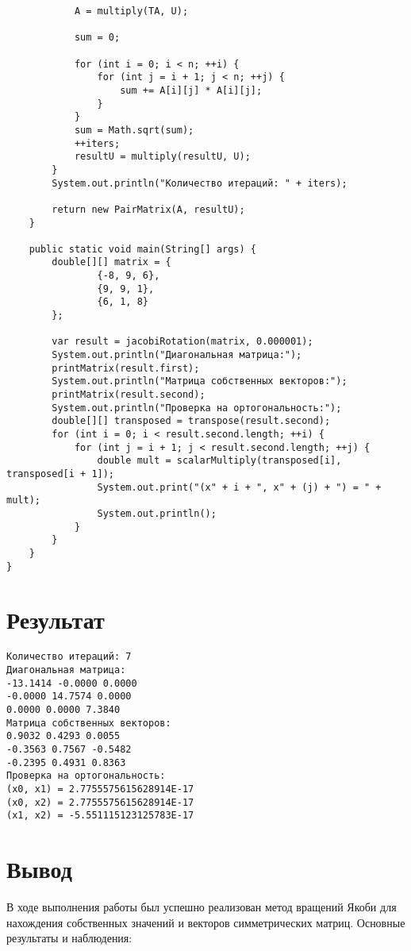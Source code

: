 \begin{verbatim}
            A = multiply(TA, U);

            sum = 0;

            for (int i = 0; i < n; ++i) {
                for (int j = i + 1; j < n; ++j) {
                    sum += A[i][j] * A[i][j];
                }
            }
            sum = Math.sqrt(sum);
            ++iters;
            resultU = multiply(resultU, U);
        }
        System.out.println("Количество итераций: " + iters);

        return new PairMatrix(A, resultU);
    }

    public static void main(String[] args) {
        double[][] matrix = {
                {-8, 9, 6},
                {9, 9, 1},
                {6, 1, 8}
        };

        var result = jacobiRotation(matrix, 0.000001);
        System.out.println("Диагональная матрица:");
        printMatrix(result.first);
        System.out.println("Матрица собственных векторов:");
        printMatrix(result.second);
        System.out.println("Проверка на ортогональность:");
        double[][] transposed = transpose(result.second);
        for (int i = 0; i < result.second.length; ++i) {
            for (int j = i + 1; j < result.second.length; ++j) {
                double mult = scalarMultiply(transposed[i], transposed[i + 1]);
                System.out.print("(x" + i + ", x" + (j) + ") = " + mult);
                System.out.println();
            }
        }
    }
}
\end{verbatim}

\section*{Результат}

\begin{verbatim}
Количество итераций: 7
Диагональная матрица:
-13.1414 -0.0000 0.0000 
-0.0000 14.7574 0.0000 
0.0000 0.0000 7.3840 
Матрица собственных векторов:
0.9032 0.4293 0.0055 
-0.3563 0.7567 -0.5482 
-0.2395 0.4931 0.8363 
Проверка на ортогональность:
(x0, x1) = 2.7755575615628914E-17
(x0, x2) = 2.7755575615628914E-17
(x1, x2) = -5.551115123125783E-17
\end{verbatim}

\section*{Вывод}

В ходе выполнения работы был успешно реализован метод вращений Якоби для нахождения собственных значений и векторов симметрических матриц. Основные результаты и наблюдения:

